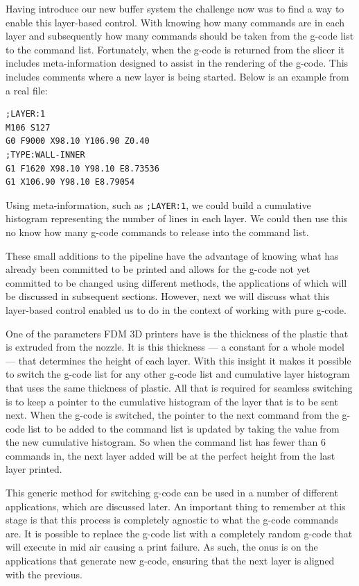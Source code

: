 \documentclass[11pt]{report} %
\begin{document}
Having introduce our new buffer system the challenge now was to find a way to enable this layer-based control. With knowing how many commands are in each layer and subsequently how many commands should be taken from the g-code list to the command list. Fortunately, when the g-code is returned from the slicer it includes meta-information designed to assist in the rendering of the g-code. This includes comments where a new layer is being started. Below is an example from a real file:
\begin{verbatim}
;LAYER:1
M106 S127
G0 F9000 X98.10 Y106.90 Z0.40
;TYPE:WALL-INNER
G1 F1620 X98.10 Y98.10 E8.73536
G1 X106.90 Y98.10 E8.79054
\end{verbatim}

Using meta-information, such as \verb|;LAYER:1|,  we could build a cumulative histogram representing the number of lines in each layer. We could then use this no know how many g-code commands to release into the command list. 

These small additions to the pipeline have the advantage of knowing what has already been committed to be printed and allows for the g-code not yet committed to be changed using different methods, the applications of which will be discussed in subsequent sections. However, next we will discuss what this layer-based control enabled us to do in the context of working with pure g-code. 

One of the parameters FDM 3D printers have is the thickness of the plastic that is extruded from the nozzle. It is this thickness --- a constant for a whole model --- that determines the height of each layer. With this insight it makes it possible to switch the g-code list for any other g-code list and cumulative layer histogram that uses the same thickness of plastic. All that is required for seamless switching is to keep a pointer to the cumulative histogram of the layer that is to be sent next. When the g-code is switched, the pointer to the next command from the g-code list to be added to the command list is updated by taking the value from the new cumulative histogram. So when the command list has fewer than 6 commands in, the next layer added will be at the perfect height from the last layer printed. 

This generic method for switching g-code can be used in a number of different applications, which are discussed later. An important thing to remember at this stage is that this process is completely agnostic to what the g-code commands are. It is possible to replace the g-code list with a completely random g-code that will execute in mid air causing a print failure. As such, the onus is on the applications that generate new g-code, ensuring that the next layer is aligned with the previous.
\end{document}
